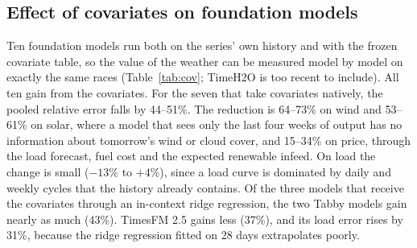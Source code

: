 \documentclass[11pt,a4paper]{article}
\begin{document}
\subsection{Effect of covariates on foundation models}

Ten foundation models run both on the series' own history and with the frozen covariate table, so the value of the
weather can be measured model by model on exactly the same races (Table~\ref{tab:cov}; TimeH2O is too recent to include). All ten gain from the covariates. For the seven that take covariates natively, the pooled relative error
falls by 44--51\%. The reduction is 64--73\% on wind and 53--61\% on solar, where a model that sees only the last four
weeks of output has no information about tomorrow's wind or cloud cover, and 15--34\% on price, through the load
forecast, fuel cost and the expected renewable infeed. On load the change is small ($-13$\% to $+4$\%), since a load
curve is dominated by daily and weekly cycles that the history already contains. Of the three models that receive the
covariates through an in-context ridge regression, the two Tabby models gain nearly as much (43\%). TimesFM 2.5 gains less (37\%), and its load error rises by 31\%, because the ridge regression fitted on
28 days extrapolates poorly.
\end{document}
